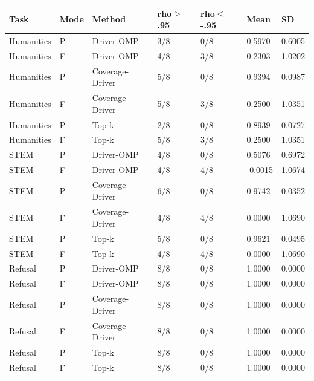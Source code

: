 \begin{tabular}{lllllll}
\toprule
Task & Mode & Method & rho$\geq$.95 & rho$\leq$-.95 & Mean & SD \\
\midrule
Humanities & P & Driver-OMP & 3/8 & 0/8 & 0.5970 & 0.6005 \\
Humanities & F & Driver-OMP & 4/8 & 3/8 & 0.2303 & 1.0202 \\
Humanities & P & Coverage-Driver & 5/8 & 0/8 & 0.9394 & 0.0987 \\
Humanities & F & Coverage-Driver & 5/8 & 3/8 & 0.2500 & 1.0351 \\
Humanities & P & Top-k & 2/8 & 0/8 & 0.8939 & 0.0727 \\
Humanities & F & Top-k & 5/8 & 3/8 & 0.2500 & 1.0351 \\
STEM & P & Driver-OMP & 4/8 & 0/8 & 0.5076 & 0.6972 \\
STEM & F & Driver-OMP & 4/8 & 4/8 & -0.0015 & 1.0674 \\
STEM & P & Coverage-Driver & 6/8 & 0/8 & 0.9742 & 0.0352 \\
STEM & F & Coverage-Driver & 4/8 & 4/8 & 0.0000 & 1.0690 \\
STEM & P & Top-k & 5/8 & 0/8 & 0.9621 & 0.0495 \\
STEM & F & Top-k & 4/8 & 4/8 & 0.0000 & 1.0690 \\
Refusal & P & Driver-OMP & 8/8 & 0/8 & 1.0000 & 0.0000 \\
Refusal & F & Driver-OMP & 8/8 & 0/8 & 1.0000 & 0.0000 \\
Refusal & P & Coverage-Driver & 8/8 & 0/8 & 1.0000 & 0.0000 \\
Refusal & F & Coverage-Driver & 8/8 & 0/8 & 1.0000 & 0.0000 \\
Refusal & P & Top-k & 8/8 & 0/8 & 1.0000 & 0.0000 \\
Refusal & F & Top-k & 8/8 & 0/8 & 1.0000 & 0.0000 \\
\bottomrule
\end{tabular}
